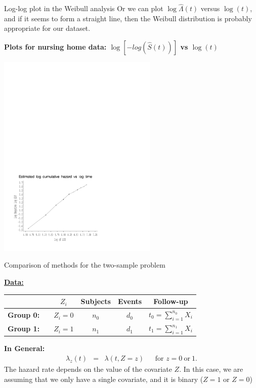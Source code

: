 \documentclass[envcountsect, 10pt, portrait, palatino]{beamer}
\begin{document}
\begin{frame}{Log-log plot in the Weibull analysis}
Or we can plot $\log\hat\Lambda(t)$ versus $\log(t)$,
and if it seems to form a straight line, then the Weibull
distribution is probably appropriate for our dataset.

{\bf Plots for nursing home data: $\log[-log(\hat{S}(t))]$ vs $\log(t)$}

\centerline{\includegraphics[width=3in]{nh_lls.pdf}}
\end{frame} 
\begin{frame}{Comparison of methods for the two-sample problem}

\underline{\bf Data:}

\begin{center}
\begin{tabular}{lcccc}
\hline
& $Z_i$ & Subjects & Events & Follow-up \\ \hline
{\bf Group 0:}~~
& $Z_{i}= 0$ & $n_0$ & $d_0$ & $t_0=\sum_{i=1}^{n_0} X_i$\\[1ex]
{\bf Group 1:}
& $Z_{i}= 1$ & $n_1$ & $d_1$ & $t_1=\sum_{i=1}^{n_1} X_i$ \\ \hline
\end{tabular}
\end{center}

\vspace{0.1in}
{\bf In General:}
\begin{eqnarray*}
\lambda_z(t) & = & \lambda(t,Z=z) ~~~~~~~\mbox{for } z=0 ~\mbox{or}~ 1.
\end{eqnarray*}
The hazard rate depends on the value of the covariate $Z$.  In this case,
we are assuming that we only have a single covariate,  and it is
binary ($Z=1$ or $Z=0$)

\end{frame}
\end{document}
